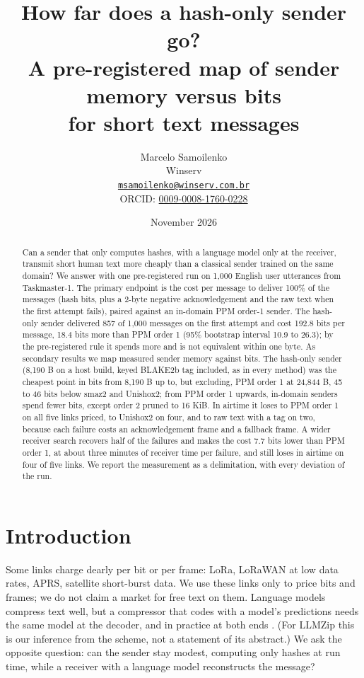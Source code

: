\documentclass[11pt]{article}
\title{How far does a hash-only sender go?\\
A pre-registered map of sender memory versus bits\\
for short text messages}
\author{Marcelo Samoilenko\\
Winserv\\
\href{mailto:msamoilenko@winserv.com.br}{\texttt{msamoilenko@winserv.com.br}}\\
ORCID: \href{https://orcid.org/0009-0008-1760-0228}{0009-0008-1760-0228}}
\date{November 2026}
\begin{document}
\maketitle

\begin{abstract}
Can a sender that only computes hashes, with a language model only at the receiver, transmit short
human text more cheaply than a classical sender trained on the same domain? We answer with one
pre-registered run on 1,000 English user utterances from Taskmaster-1. The primary endpoint is the
cost per message to deliver 100\% of the messages (hash bits, plus a 2-byte negative acknowledgement
and the raw text when the first attempt fails), paired against an in-domain PPM order-1 sender. The
hash-only sender delivered 857 of 1,000 messages on the first attempt and cost 192.8 bits per
message, 18.4 bits more than PPM order 1 (95\% bootstrap interval 10.9 to 26.3); by the
pre-registered rule it spends more and is not equivalent within one byte. As secondary results we
map measured sender memory against bits. The hash-only sender (8,190 B on a host build, keyed BLAKE2b
tag included, as in every method) was the cheapest point in bits from 8,190 B up to, but excluding,
PPM order 1 at 24,844 B, 45 to 46 bits below smaz2 and Unishox2; from PPM order 1 upwards, in-domain
senders spend fewer bits, except order 2 pruned to 16 KiB. In airtime it loses to PPM order 1 on all five links priced, to Unishox2
on four, and to raw text with a tag on two, because each failure costs an acknowledgement frame and
a fallback frame. A wider receiver search recovers half of the failures and makes the cost 7.7 bits
lower than PPM order 1, at about three minutes of receiver time per failure, and still loses in
airtime on four of five links. We report the measurement as a delimitation, with every deviation of
the run.
\end{abstract}

\section{Introduction}

Some links charge dearly per bit or per frame: LoRa, LoRaWAN at low data rates, APRS, satellite
short-burst data. We use these links only to price bits and frames; we do not claim a market for
free text on them. Language models compress text well, but a compressor that codes with a model's
predictions needs the same model at the decoder, and in practice at both ends
\cite{valmeekam2023llmzip,deletang2024}. (For LLMZip this is our inference from the scheme, not a
statement of its abstract.) We ask the opposite question: can the sender stay modest, computing only
hashes at run time, while a receiver with a language model reconstructs the message?
\end{document}
